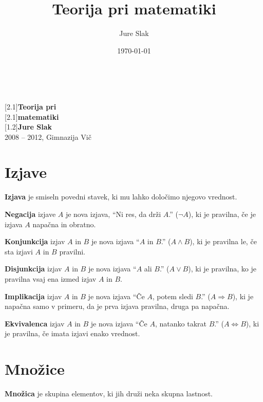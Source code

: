 \documentclass[a4paper,oneside,12pt,fleqn]{article}
\title{Teorija pri matematiki}
\author{Jure Slak}
\date{\today}
\renewcommand\implies\Rightarrow
\renewcommand\iff\Leftrightarrow
\numberwithin{equation}{section}
\begin{document}
\setlength{\abovedisplayskip}{3pt}
\setlength{\belowdisplayskip}{6pt}

\renewcommand{\listfigurename}{Kazalo slik} 

\thispagestyle{empty}

\mbox{}\\
\vspace{3ex}

\noindent \scalebox{1.8}[2.1]{\textsf{{\Huge \bfseries Teorija pri}}} \\[5pt]
\scalebox{1.8}[2.1]{\textsf{{\Huge \bfseries matematiki}}} \\[60pt]
\scalebox{1}[1.2]{\textsf{\Huge \bfseries Jure Slak}} \\[45pt]
\textsf{2008 -- 2012, Gimnazija Vič}

\vspace{-10pt}
\noindent \mbox{} \hspace{-20pt} 


\pagebreak

\thispagestyle{empty}
\tableofcontents
\pagebreak

\section{Izjave}
\label{sec:izjave}
\textbf{Izjava} je smiseln povedni stavek, ki mu lahko določimo njegovo vrednost.

\textbf{Negacija} izjave $A$ je nova izjava, ``Ni res, da drži $A$.'' ($\neg A$), ki je pravilna, če je izjava $A$
napačna in obratno. 

\textbf{Konjunkcija} izjav $A$ in $B$ je nova izjava ``$A$ in $B$.'' ($A \land
B$), ki je pravilna le, če sta izjavi $A$ in $B$ pravilni.

\textbf{Disjunkcija} izjav $A$ in $B$ je nova izjava ``$A$ ali $B$.'' ($A \lor B$), 
ki je pravilna, ko je pravilna vsaj ena izmed izjav $A$ in $B$.

\textbf{Implikacija} izjav $A$ in $B$ je nova izjava ``Če $A$, potem sledi $B$.'' ($A
\implies B$), ki je napačna samo v primeru, da je prva izjava pravilna, druga pa napačna.

\textbf{Ekvivalenca} izjav $A$ in $B$ je nova izjava ``Če $A$, natanko takrat $B$.'' ($A 
\iff B$), ki je pravilna, če imata izjavi enako vrednost.

\section{Množice}
\label{sec:mnozice}
\textbf{Množica} je skupina elementov, ki jih druži neka skupna lastnost. 
\end{document}
